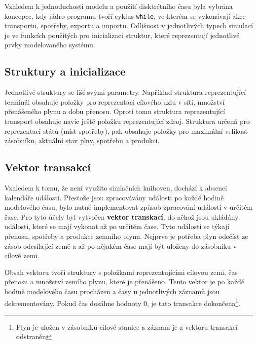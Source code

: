 \documentclass[a4paper,11pt]{article}
\begin{document}

Vzhledem k jednoduchosti modelu a použití
disktrétního času \cite[str,22]{IMS} byla vybrána koncepce,
kdy jádro programu tvoří cyklus \texttt{while}, ve kterém se
vykonávají akce transportu, spotřeby, exportu a importu.
Odlišnost v jednotlivých typech simulací je ve funkcích
použitých pro inicializaci struktur, které reprezentují
jednotlivé prvky modelovaného systému.

\subsection{Struktury a inicializace}

Jednotlivé struktury se liší svými parametry.
Například struktura reprezentující terminál obsahuje položky pro reprezentaci cílového uzlu v síti,
množství přenášeného plynu a dobu přenosu.
Oproti tomu struktura reprezentující transport obsahuje navíc ještě položku reprezentující zdroj.
Struktura určená pro reprezentaci států (míst spotřeby), pak obsahuje položky pro maximální velikost zásobníku,
aktuální stav plny, spotřebu a  produkci.

\subsection{Vektor transakcí}

Vzhledem k tomu, že není využito simlačních knihoven, dochází k absenci kalendáře událostí.
Přestože jsou zpracovávány události po každé hodině modelového času,
bylo nutné implementovat způsob zpracování událostí v určitém čase.
Pro tyto účely byl vytvořen \textbf{vektor transkací}, do něhož jsou ukládány události,
které se mají vykonat až po určitém čase.
Tyto události se týkají přenosu, spotřeby a produkce zemního plynu.
Nejprve je potřeba plyn odečíst ze zásob odesílající země a až po nějakém čase mají být uloženy do zásobníku v cílové zemi.

Obsah vektoru tvoří struktury s položkami reprezentujícími cílovou zemi,
čas přenosu a množství zemího plynu, které je přenášeno.
Tento vektor je po každé hodině modelového času procházen a časy u jednotlivých záznamů jsou dekrementovány.
Pokud čas dosáhne hodnoty 0, je tato transakce dokončena\footnote{Plyn je uložen v zásobníku cílové stanice a záznam je z vektoru transakcí odstraněn}. 
\end{document}
